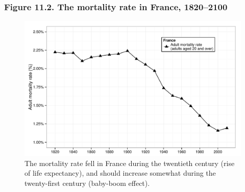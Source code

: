 \documentclass[t]{beamer}\usepackage[]{graphicx}\usepackage[]{color}
\newenvironment{knitrout}{}{} %
\begin{document}
\begin{frame}[label=Figure_11_2]
\frametitle{Figure 11.2. The mortality rate in France, 1820--2100}
\begin{figure}[t]
\begin{minipage}[b]{\textwidth}
\centering
\begin{knitrout}\footnotesize
{}\color{fgcolor}

{\centering \includegraphics[width=1\linewidth]{figures/bw/Figure_11_2} 

}



\end{knitrout}
\caption{The mortality rate fell in France during the twentieth century (rise of life expectancy), and should increase somewhat during the twenty-first century (baby-boom effect).}
\end{minipage}
\end{figure}
\end{frame}
\end{document}

